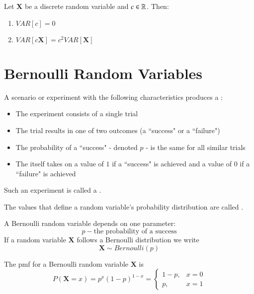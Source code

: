 \documentclass[12pt]{report}
\begin{document}
\begin{prop}{}{}
    Let $\mathbf{X}$ be a discrete random variable and $c \in \mathbb R$. Then: \begin{enumerate}
        \item $VAR[c] = 0$
        \item $VAR[c\mathbf{X}] = c^2VAR[\mathbf{X}]$
    \end{enumerate}
\end{prop}


\section{Bernoulli Random Variables}

\begin{defn}{}{}
    A scenario or experiment with the following characteristics produces a : \begin{itemize}
        \item The experiment consists of a single trial
        \item The trial results in one of two outcomes (a ``success" or a ``failure")
        \item The probability of a ``success" - denoted $p$ - is the same for all similar trials 
        \item The  itself takes on a value of $1$ if a ``success" is achieved and a value of $0$ if a ``failure" is achieved
    \end{itemize}
    Such an experiment is called a .
\end{defn}

\begin{defn}{}{}
    The values that define a random variable's probability distribution are called .
\end{defn}

\begin{defn}{}{}
    A Bernoulli random variable depends on one parameter: \begin{equation*}
        p - \text{the probability of a success}
    \end{equation*}
    If a random variable $\mathbf{X}$ follows a Bernoulli distribution we write $$\mathbf{X}\sim Bernoulli(p)$$
\end{defn}

\begin{defn}{}{}
    The pmf for a Bernoulli random variable $\mathbf{X}$ is \begin{equation*}
        P(\mathbf{X} = x) = p^x(1-p)^{1-x} = \left\{\begin{array}{lc} 1-p, & x=0 \\ p, & x=1\end{array}\right.
    \end{equation*}
\end{defn}
\end{document}
